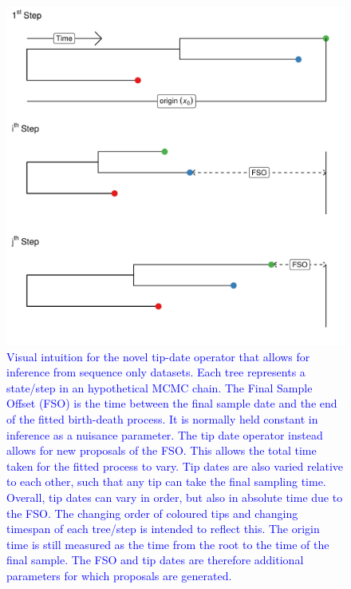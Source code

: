 \documentclass{article}
\begin{document}
\renewcommand{\thefigure}{S\arabic{figure}}
\setcounter{figure}{0}

\begin{figure}[H]
\centering
\includegraphics[width=1\linewidth]{../figures/tipDateOp.pdf}
\caption{\textcolor{blue}{Visual intuition for the novel tip-date operator that allows for inference from sequence only datasets. Each tree represents a state/step in an hypothetical MCMC chain. The Final Sample Offset (FSO) is the time between the final sample date and the  end of the fitted birth-death process. It is normally held constant in inference as a nuisance parameter. The tip date operator instead allows for new proposals of the FSO. This allows the total time taken for the fitted process to vary. Tip dates are also varied relative to each other, such that any tip can take the final sampling time. Overall, tip dates can vary in order, but also in absolute time due to the FSO. The changing order of coloured tips and changing timespan of each tree/step is intended to reflect this. The origin time is still measured as the time from the root to the time of the final sample.  The FSO and tip dates are therefore additional parameters for which proposals are generated.}}
\label{fig:tipOp}
\end{figure}
\end{document}
